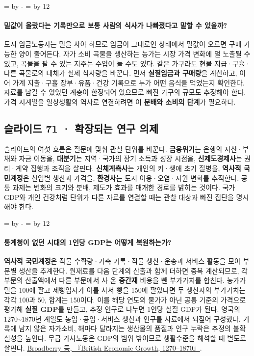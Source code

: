 \documentclass[10pt,a4paper]{article}
\newcommand{\ReserveQuestionSpace}{%
  \par\begingroup
  \dimen0=\pagegoal \advance\dimen0 by -\pagetotal
  \dimen2=\baselineskip \multiply\dimen2 by 12
  \ifdim\dimen0<\dimen2 \newpage\fi
  \endgroup}
\begin{document}
\ReserveQuestionSpace
\paragraph{밀값이 올랐다는 기록만으로 보통 사람의 식사가 나빠졌다고 말할 수 있을까?}

도시 임금노동자는 밀을 사야 하므로 임금이 그대로인 상태에서 밀값이 오르면 구매 가능한 양이 줄어든다. 자가 소비 곡물을 생산하는 농가는 시장 가격 변화에 덜 노출될 수 있고, 곡물을 팔 수 있는 지주는 수입이 늘 수도 있다. 같은 가구라도 현물 지급·구휼·다른 곡물로의 대체가 실제 식사량을 바꾼다. 먼저 \textbf{실질임금과 구매량}을 계산하고, 이어 가계 지출·구휼 장부·유품·건강 기록으로 누가 어떤 음식을 먹었는지 확인한다. 자료를 남길 수 있었던 계층이 한정되어 있으므로 빠진 가구의 규모도 추정해야 한다. 가격 시계열을 일상생활의 역사로 연결하려면 이 \textbf{분배와 소비의 단계}가 필요하다.\par

\subsection{슬라이드 71 · 확장되는 연구 의제}
슬라이드의 여섯 흐름은 질문에 맞춰 관찰 단위를 바꾼다. \textbf{금융위기}는 은행의 자산·부채와 자금 이동을, \textbf{대분기}는 지역·국가의 장기 소득과 성장 시점을, \textbf{신제도경제사}는 권리·계약 집행과 조직을 살핀다. \textbf{신체계측사}는 개인의 키·생애 초기 질병을, \textbf{역사적 국민계정}은 산업별 생산과 가격을, \textbf{환경사}는 토지 이용·오염·자원 변화를 추적한다. 공통 과제는 변화의 크기와 분배, 제도가 효과를 매개한 경로를 밝히는 것이다. 국가 GDP와 개인 건강처럼 단위가 다른 자료를 연결할 때는 관찰 대상과 빠진 집단을 명시해야 한다.\par

\ReserveQuestionSpace
\paragraph{통계청이 없던 시대의 1인당 GDP는 어떻게 복원하는가?}

\textbf{역사적 국민계정}은 작물 수확량·가축 기록·직물 생산·운송과 서비스 활동을 모아 부문별 생산을 추계한다. 원재료를 다음 단계의 산출과 함께 더하면 중복 계산되므로, 각 부문의 산출액에서 다른 부문에서 사 온 \textbf{중간재} 비용을 뺀 부가가치를 합친다. 농가가 밀을 100에 팔고 제빵업자가 이를 사서 빵을 150에 팔았다면 두 생산자의 부가가치는 각각 100과 50, 합계는 150이다. 이를 해당 연도의 물가가 아닌 공통 기준의 가격으로 평가해 \textbf{실질 GDP}를 만들고, 추정 인구로 나누면 1인당 실질 GDP가 된다. 영국의 1270\textasciitilde{}1870년 계열도 농업·공업·서비스 생산과 인구를 사료에서 되짚어 구성했다. 기록에 남지 않은 자가소비, 해마다 달라지는 생산물의 품질과 인구 누락은 추정의 불확실성을 높인다. 무급 가사노동은 GDP의 범위 밖이므로 생활수준을 해석할 때 별도로 살핀다. \href{https://www.cambridge.org/core/books/british-economic-growth-1270-1870/A270234C137117C8E0F1D1E7E6F0DA56}{Broadberry 등, 『British Economic Growth, 1270–1870』}.\par
\end{document}
